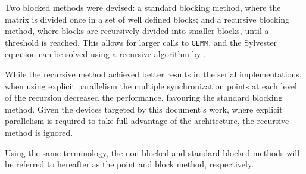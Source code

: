 \documentclass[../thesis]{subfiles}
\begin{document}
		Two blocked methods were devised: a standard blocking method, where the matrix is divided once in a set of well defined blocks; and a recursive blocking method, where blocks are recursively divided into smaller blocks, until a threshold is reached. This allows for larger calls to \texttt{GEMM}, and the Sylvester equation can be solved using a recursive algorithm by \cite{Jonsson:Kagstrom:2002}.

		While the recursive method achieved better results in the serial implementations, when using explicit parallelism the multiple synchronization points at each level of the recursion decreased the performance, favouring the standard blocking method. Given the devices targeted by this document's work, where explicit parallelism is required to take full advantage of the architecture, the recursive method is ignored.

		Using the same terminology, the non-blocked and standard blocked methods will be referred to hereafter as the point and block method, respectively.
\end{document}
